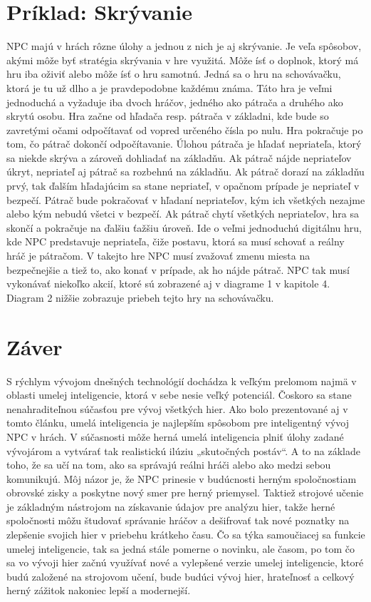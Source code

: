 \documentclass[10pt,twoside,slovak,a4paper]{article}
\begin{document}
\section{Príklad: Skrývanie} 
\quad NPC majú v hrách rôzne úlohy a jednou z nich je aj skrývanie. Je veľa spôsobov, akými môže byť stratégia skrývania v hre využitá. Môže ísť o doplnok, ktorý má hru iba oživiť alebo môže ísť o hru samotnú. Jedná sa o hru na schovávačku, ktorá je tu už dlho a je pravdepodobne každému známa. Táto hra je veľmi jednoduchá a vyžaduje iba dvoch hráčov, jedného ako pátrača a druhého ako skrytú osobu. Hra začne od hľadača resp. pátrača v základni, kde bude so zavretými očami odpočítavať od vopred určeného čísla po nulu. Hra pokračuje po tom, čo pátrač dokončí odpočítavanie. Úlohou pátrača je hľadať nepriateľa, ktorý sa niekde skrýva a zároveň dohliadať na základňu. Ak pátrač nájde nepriateľov úkryt, nepriateľ aj pátrač sa rozbehnú na základňu. Ak pátrač dorazí na základňu prvý, tak ďalším hľadajúcim sa stane nepriateľ, v opačnom prípade je nepriateľ v bezpečí. Pátrač bude pokračovať v hľadaní nepriateľov, kým ich všetkých nezajme alebo kým nebudú všetci v bezpečí. Ak pátrač chytí všetkých nepriateľov, hra sa skončí a pokračuje na ďalšiu ťažšiu úroveň. Ide o veľmi jednoduchú digitálnu hru, kde NPC predstavuje nepriateľa, čiže postavu, ktorá sa musí schovať a reálny hráč je pátračom. V takejto hre NPC musí zvažovať zmenu miesta na bezpečnejšie a tiež to, ako konať v prípade, ak ho nájde pátrač. NPC tak musí vykonávať niekoľko akcií, ktoré sú zobrazené aj v diagrame 1 v kapitole 4. Diagram 2 nižšie zobrazuje priebeh tejto hry na schovávačku. 

\section{Záver} \label{zaver} 
\quad S rýchlym vývojom dnešných technológií dochádza k veľkým prelomom najmä v oblasti umelej inteligencie, ktorá v sebe nesie veľký potenciál. Čoskoro sa stane nenahraditeľnou súčasťou pre vývoj všetkých hier. Ako bolo prezentované aj v tomto článku, umelá inteligencia je najlepším spôsobom pre inteligentný vývoj NPC v hrách. V súčasnosti môže herná umelá inteligencia plniť úlohy zadané vývojárom a vytvárať tak realistickú ilúziu „skutočných postáv“. A to na základe toho, že sa učí na tom, ako sa správajú reálni hráči alebo ako medzi sebou komunikujú. Môj názor je, že NPC prinesie v budúcnosti herným spoločnostiam obrovské zisky a poskytne nový smer pre herný priemysel. Taktiež strojové učenie je základným nástrojom na získavanie údajov pre analýzu hier, takže herné spoločnosti môžu študovať správanie hráčov a dešifrovať tak nové poznatky na zlepšenie svojich hier v priebehu krátkeho času. Čo sa týka samoučiacej sa funkcie umelej inteligencie, tak sa jedná stále pomerne o novinku, ale časom, po tom čo sa vo vývoji hier začnú využívať nové a vylepšené verzie umelej inteligencie, ktoré budú založené na strojovom učení, bude budúci vývoj hier, hrateľnosť a celkový herný zážitok nakoniec lepší a modernejší.
\end{document}
